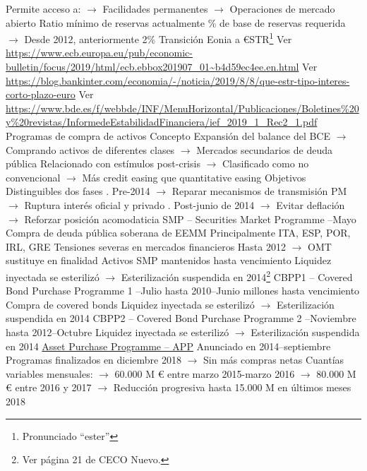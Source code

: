 \documentclass{nuevotema}
\begin{document}
\begin{esquemal}
				\4[] Permite acceso a:
				\4[] $\to$ Facilidades permanentes
				\4[] $\to$ Operaciones de mercado abierto
				\4 Ratio mínimo de reservas actualmente
				\% de base de reservas requerida
				\4[] $\to$ Desde 2012, anteriormente 2\%
			\3 Transición Eonia a €STR\footnote{Pronunciado ``ester''}
				\4 Ver \url{https://www.ecb.europa.eu/pub/economic-bulletin/focus/2019/html/ecb.ebbox201907_01~b4d59ec4ee.en.html}
				\4 Ver \url{https://blog.bankinter.com/economia/-/noticia/2019/8/8/que-estr-tipo-interes-corto-plazo-euro}
				\4 Ver \url{https://www.bde.es/f/webbde/INF/MenuHorizontal/Publicaciones/Boletines\%20y\%20revistas/InformedeEstabilidadFinanciera/ief_2019_1_Rec2_1.pdf}
			\3 Programas de compra de activos
				\4 Concepto
				\4[] Expansión del balance del BCE
				\4[] $\to$ Comprando activos de diferentes clases
				\4[] $\to$ Mercados secundarios de deuda pública
				\4[] Relacionado con estímulos post-crisis
				\4[] $\to$ Clasificado como no convencional
				\4[] $\to$ Más credit easing que quantitative easing
				\4 Objetivos
				\4[] Distinguibles dos fases
				. Pre-2014
				\4[] $\to$ Reparar mecanismos de transmisión PM
				\4[] $\to$ Ruptura interés oficial y privado
				. Post-junio de 2014
				\4[] $\to$ Evitar deflación
				\4[] $\to$ Reforzar posición acomodaticia
				\4 SMP -- Securities Market Programme
				--Mayo
				\4[] Compra de deuda pública soberana de EEMM
				\4[] Principalmente ITA, ESP, POR, IRL, GRE
				\4[] Tensiones severas en mercados financieros
				\4[] Hasta 2012
				\4[] $\to$ OMT sustituye en finalidad
				\4[] Activos SMP mantenidos hasta vencimiento
				\4[] Liquidez inyectada se esterilizó
				\4[] $\to$ Esterilización suspendida en 2014\footnote{Ver página 21 de CECO Nuevo.}
				\4 CBPP1 -- Covered Bond Purchase Programme 1
				--Julio hasta 2010--Junio
				 millones hasta vencimiento
				\4[] Compra de covered bonds
				\4[] Liquidez inyectada se esterilizó
				\4[] $\to$ Esterilización suspendida en 2014
				\4 CBPP2 -- Covered Bond Purchase Programme 2
				--Noviembre hasta 2012--Octubre
				\4[] Liquidez inyectada se esterilizó
				\4[] $\to$ Esterilización suspendida en 2014
				\4 \underline{Asset Purchase Programme -- APP}
				\4[] Anunciado en 2014--septiembre
				\4[] Programas finalizados en diciembre 2018
				\4[] $\to$ Sin más compras netas
				\4[] Cuantías variables mensuales:
				\4[] $\to$ 60.000 M € entre marzo 2015-marzo 2016
				\4[] $\to$ 80.000 M € entre 2016 y 2017
				\4[] $\to$ Reducción progresiva hasta 15.000 M en últimos meses 2018

\end{esquemal}
\end{document}
